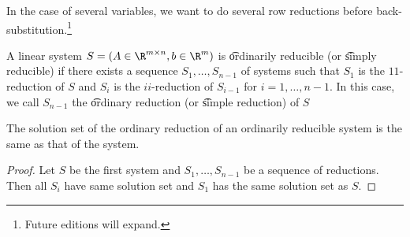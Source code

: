 

In the case of several variables, we want to do several row reductions before back-substitution.\footnote{Future editions will expand.}


A linear system $S = (A \in \R^{m \times n}, b \in \R^{m})$ is \t{ordinarily reducible} (or \t{simply reducible}) if there exists a sequence $S_1, \dots, S_{n-1}$ of systems such that $S_1$ is the $11$-reduction of $S$ and $S_{i}$ is the $ii$-reduction of $S_{i-1}$ for $i = 1, \dots, n-1$.
In this case, we call $S_{n-1}$ the \t{ordinary reduction} (or \t{simple reduction}) of $S$

\begin{proposition}
	The solution set of the ordinary reduction of an ordinarily reducible system is the same as that of the system.
	\begin{proof}
    Let $S$ be the first system and $S_1, \dots, S_{n-1}$ be a sequence of reductions.
    Then all $S_i$ have same solution set and $S_1$ has the same solution set as $S$.
	\end{proof}
	\label{proposition:ordinary_row_reductions:main}
\end{proposition}


